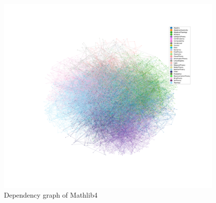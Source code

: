 \begin{figure}[H]
    \centering
    \includegraphics[width=1.0\textwidth]{../img/data.pdf}
    \caption{Dependency graph of Mathlib4}
    \label{fig:dependency}
\end{figure}

